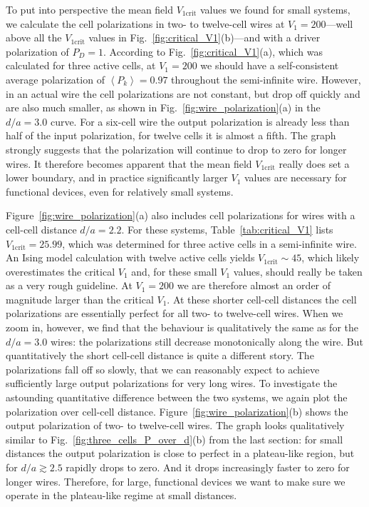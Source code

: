 To put into perspective the mean field $V_{1\textrm{crit}}$ values we found for
small  systems, we calculate the cell polarizations in two- to
twelve-cell wires at $V_1 = 200$---well above all the $V_{1\textrm{crit}}$
values in Fig.~\ref{fig:critical_V1}(b)---and with a driver polarization of $P_D
= 1$. According to Fig.~\ref{fig:critical_V1}(a), which was calculated for
three active cells, at $V_1 = 200$ we should have a self-consistent average
polarization of $\left< P_k \right> = 0.97$ throughout the semi-infinite wire.
However, in an actual wire the cell polarizations are not constant, but drop off
quickly and are also much smaller, as shown in
Fig.~\ref{fig:wire_polarization}(a) in the $d/a = 3.0$ curve. For a six-cell
wire the output polarization is already less than half of the input
polarization, for twelve cells it is almost a fifth. The graph strongly suggests
that the polarization will continue to drop to zero for longer wires. It
therefore becomes apparent that the mean field $V_{1\textrm{crit}}$ really does
set a lower boundary, and in practice significantly larger $V_1$ values are
necessary for functional  devices, even for relatively small systems.

Figure~\ref{fig:wire_polarization}(a) also includes cell polarizations for wires
with a cell-cell distance $d/a = 2.2$. For these systems,
Table~\ref{tab:critical_V1} lists $V_{1\textrm{crit}} = 25.99$, which was
determined for three active cells in a semi-infinite wire. An Ising model
calculation with twelve active cells yields $V_{1\textrm{crit}} \sim 45$, which
likely overestimates the critical $V_1$ and, for these small $V_1$ values,
should really be taken as a very rough guideline. At $V_1 = 200$ we are
therefore almost an order of magnitude larger than the critical $V_1$. At these
shorter cell-cell distances the cell polarizations are essentially perfect for
all two- to twelve-cell wires. When we zoom in, however, we find that the
behaviour is qualitatively the same as for the $d/a = 3.0$ wires: the
polarizations still decrease monotonically along the wire. But quantitatively
the short cell-cell distance is quite a different story. The polarizations fall
off so slowly, that we can reasonably expect to achieve sufficiently large
output polarizations for very long wires. To investigate the astounding
quantitative difference between the two systems, we again plot the polarization
over cell-cell distance. Figure~\ref{fig:wire_polarization}(b) shows the output
polarization of two- to twelve-cell wires. The graph looks qualitatively similar
to Fig.~\ref{fig:three_cells_P_over_d}(b) from the last section: for small
distances the output polarization is close to perfect in a plateau-like region,
but for $d/a \gtrsim 2.5$ rapidly drops to zero. And it drops increasingly
faster to zero for longer wires. Therefore, for large, functional 
devices we want to make sure we operate in the plateau-like regime at small
distances.


